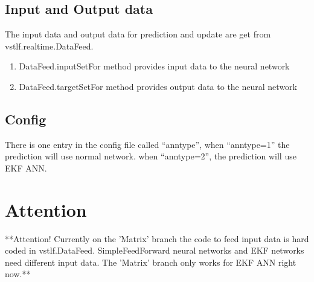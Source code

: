 \documentclass[letterpaper]{article}
\begin{document}
\subsection{Input and Output data}
The input data and output data for prediction and update are get from vstlf.realtime.DataFeed.
\begin{enumerate}
  \item DataFeed.inputSetFor method provides input data to the neural network
  \item DataFeed.targetSetFor method provides output data to the neural network
\end{enumerate}


\subsection{Config}
There is one entry in the config file called ``anntype'', when ``anntype=1'' the prediction will use normal network. when ``anntype=2'', the prediction will use EKF ANN.

\section{Attention}
**Attention! Currently on the 'Matrix' branch the code to feed input data is hard coded in vstlf.DataFeed. SimpleFeedForward neural networks and EKF networks need different input data. The 'Matrix' branch only works for EKF ANN right now.**
\end{document}
